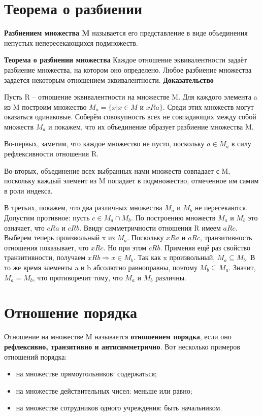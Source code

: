 \documentclass[a4paper]{article}
\begin{document}
\section*{Теорема о разбиении}
\textbf{Разбиением множества M} называется его представление в виде объединения непустых непересекающихся подмножеств.

\textbf{Теорема о разбиении множества} 
Каждое отношение эквивалентности
задаёт разбиение множества, на котором оно определено. Любое разбиение множества задается некоторым отношением эквивалентности.
\textbf{Доказательство}

Пусть R –
отношение эквивалентности на множестве M. Для каждого элемента a из M построим множество $M_a = \{x | x \in M$ и $x R a\}$. Среди этих множеств могут
оказаться одинаковые. Соберём совокупность всех не совпадающих между
собой множеств $M_a$ и покажем, что их объединение образует разбиение множества M. 

Во-первых, заметим, что каждое множество не пусто, поскольку $a \in M_a$ в
силу рефлексивности отношения R.

Во-вторых, объединение всех выбранных нами множеств совпадает с M,
поскольку каждый элемент из M попадает в подмножество, отмеченное им
самим в роли индекса.

В третьих, покажем, что два различных множества $M_a$ и $M_b$ не пересекаются.
Допустим противное: пусть $c \in M_a \cap M_b$. По построению множеств $M_a$ и $M_b$ это
означает, что $c R a$ и $c R b$. Ввиду симметричности отношения R имеем $a R c$.
Выберем теперь произвольный x из $M_a$. Поскольку $x R a$ и $a R c$, транзитивность
отношения показывает, что $x R c$. Но при этом $c R b$. Применяя ещё раз свойство
транзитивности, получаем $x R b \Rightarrow x \in M_b$. Так как x произвольный, $M_a \subseteq M_b$. В то же время элементы a и b абсолютно
равноправны, поэтому $M_b \subseteq M_a$. Значит, $M_a = M_b$, что противоречит тому, что $M_a$ и $M_b$ различны.

\section*{Отношение порядка}
Отношение на множестве M называется \textbf{отношением
порядка}, если оно \textbf{рефлексивно, транзитивно и антисимметрично}.
Вот несколько примеров отношений порядка:
\begin{itemize}
\item на множестве прямоугольников: содержаться;
\item на множестве действительных чисел: меньше или равно;
\item на множестве сотрудников одного учреждения: быть начальником.
\end{itemize}
\end{document}
